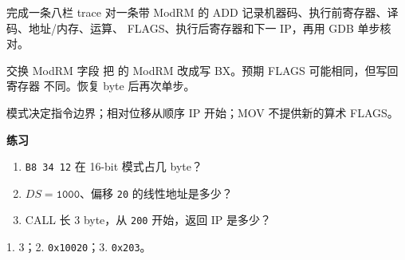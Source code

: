 
\begin{experimentbox}{完成一条八栏 trace}
对一条带 ModRM 的 ADD 记录机器码、执行前寄存器、译码、地址/内存、运算、
FLAGS、执行后寄存器和下一 IP，再用 GDB 单步核对。
\end{experimentbox}

\begin{faultinjectionbox}{交换 ModRM 字段}
把  的 ModRM 改成写 BX。预期 FLAGS 可能相同，但写回寄存器
不同。恢复 byte 后再次单步。
\end{faultinjectionbox}

\begin{pitfallbox}
模式决定指令边界；相对位移从顺序 IP 开始；MOV 不提供新的算术 FLAGS。
\end{pitfallbox}

\textbf{练习}
\begin{enumerate}[leftmargin=2.2em]
  \item \texttt{B8 34 12} 在 16-bit 模式占几 byte？
  \item \(DS=\texttt{1000}\)、偏移 \texttt{20} 的线性地址是多少？
  \item CALL 长 3 byte，从 \texttt{200} 开始，返回 IP 是多少？
\end{enumerate}
\begin{answerbox}
1. 3；2. \texttt{0x10020}；3. \texttt{0x203}。
\end{answerbox}
